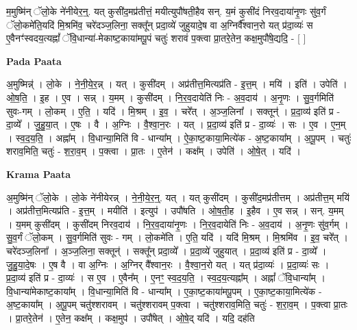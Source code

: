 \documentclass[17pt]{extarticle}
\begin{document}
म॒मुष्मि॑न् ॅलो॒के ने॑नीयेर॒न्॒. यत् कुसी॑द॒मप्र॑तीत्तं॒ मयीत्युपौ॑षती॒हैव सन्. य॒मं कुसी॑दं निरव॒दाया॑नृ॒णः सु॑व॒र्गं ॅलो॒कमे॑ति॒यदि॑ मि॒श्रमि॑व॒ चरे॑दञ्ज॒लिना॒ सक्तू᳚न् प्रदा॒व्ये॑ जुहुयादे॒ष वा अ॒ग्निर्वै᳚श्वान॒रो यत् प्र॑दा॒व्यः॑ स ए॒वैनꣳ॑स्वदय॒त्यह्नां᳚ ॅवि॒धान्या॑-मेकाष्ट॒काया॑मपू॒पं चतुः॑ शरावं प॒क्त्वा प्रा॒तरे॒तेन॒ कक्ष॒मुपौ॑षे॒द्यदि॒ - [  ] \newline

\textbf{Pada Paata} \newline

अ॒मुष्मिन्न्॑ । लो॒के । ने॒नी॒ये॒र॒न्न् । यत् । कुसी॑दम् । अप्र॑तीत्त॒मित्यप्र॑ति - इ॒त्त॒म् । मयि॑ । इति॑ । उपेति॑ । ओ॒ष॒ति॒ । इ॒ह । ए॒व । सन्न् । य॒मम् । कुसी॑दम् । नि॒र॒व॒दायेति॑ निः - अ॒व॒दाय॑ । अ॒नृ॒णः । सु॒व॒र्गमिति॑ सुवः-गम् । लो॒कम् । ए॒ति॒ । यदि॑ । मि॒श्रम् । इ॒व॒ । चरे᳚त् । अ॒ञ्ज॒लिना᳚ । सक्तून्॑ । प्र॒दा॒व्य॑ इति॑ प्र - दा॒व्ये᳚ । जु॒हु॒या॒त् । ए॒षः । वै । अ॒ग्निः । वै॒श्वा॒न॒रः । यत् । प्र॒दा॒व्य॑ इति॑ प्र - दा॒व्यः॑ । सः । ए॒व । ए॒न॒म् । स्व॒द॒य॒ति॒ । अह्ना᳚म् । वि॒धान्या॒मिति॑ वि - धान्या᳚म् । ऐ॒का॒ष्ट॒काया॒मित्ये॑क - अ॒ष्ट॒काया᳚म् । अ॒पू॒पम् । चतुः॑ शराव॒मिति॒ चतुः॑ - श॒रा॒व॒म् । प॒क्त्वा । प्रा॒तः । ए॒तेन॑ । कक्ष᳚म् । उपेति॑ । ओ॒षे॒त् । यदि॑ ।  \newline


\textbf{Krama Paata} \newline

अ॒मुष्मि॑न् ॅलो॒के । लो॒के ने॑नीयेरन्न् । ने॒नी॒ये॒र॒न्॒. यत् । यत् कुसी॑दम् । कुसी॑द॒मप्र॑तीत्तम् । अप्र॑तीत्त॒म् मयि॑ । अप्र॑तीत्त॒मित्यप्र॑ति - इ॒त्त॒म् । मयीति॑ । इत्युप॑ । उपौ॑षति । ओ॒ष॒ती॒ह । इ॒हैव । ए॒व सन्न् । सन्. य॒मम् । य॒मम् कुसी॑दम् । कुसी॑दम् निरव॒दाय॑ । नि॒र॒व॒दाया॑नृ॒णः । नि॒र॒व॒दायेति॑ निः - अ॒व॒दाय॑ । अ॒नृ॒णः सु॑व॒र्गम् । सु॒व॒र्गं ॅलो॒कम् । सु॒व॒र्गमिति॑ सुवः - गम् । लो॒कमे॑ति । ए॒ति॒ यदि॑ । यदि॑ मि॒श्रम् । मि॒श्रमि॑व । इ॒व॒ चरे᳚त् । चरे॑दञ्ज॒लिना᳚ । अ॒ञ्ज॒लिना॒ सक्तून्॑ । सक्तू᳚न् प्रदा॒व्ये᳚ । प्र॒दा॒व्ये॑ जुहुयात् । प्र॒दा॒व्य॑ इति॑ प्र - दा॒व्ये᳚ । जु॒हु॒या॒दे॒षः । ए॒ष वै । वा अ॒ग्निः । अ॒ग्निर् वै᳚श्वान॒रः । वै॒श्वा॒न॒रो यत् । यत् प्र॑दा॒व्यः॑ । प्र॒दा॒व्यः॑ सः । प्र॒दा॒व्य॑ इति॑ प्र - दा॒व्यः॑ । स ए॒व । ए॒वैन᳚म् । ए॒नꣳ॒॒ स्व॒द॒य॒ति॒ । स्व॒द॒य॒त्यह्ना᳚म् । अह्नां᳚ ॅवि॒धान्या᳚म् । वि॒धान्या॑मेकाष्ट॒काया᳚म् । वि॒धान्या॒मिति॑ वि - धान्या᳚म् । ए॒का॒ष्ट॒काया॑मपू॒पम् । ए॒का॒ष्ट॒काया॒मित्ये॑क - अ॒ष्ट॒काया᳚म् । अ॒पू॒पम् चतु॑श्शरावम् । चतु॑श्शरावम् प॒क्त्वा । चतु॑श्शराव॒मिति॒ चतुः॑ - श॒रा॒व॒म् । प॒क्त्वा प्रा॒तः । प्रा॒तरे॒तेन॑ । ए॒तेन॒ कक्ष᳚म् । कक्ष॒मुप॑ । उपौ॑षेत् । ओ॒षे॒द् यदि॑ । यदि॒ दह॑ति \newline
\end{document}
